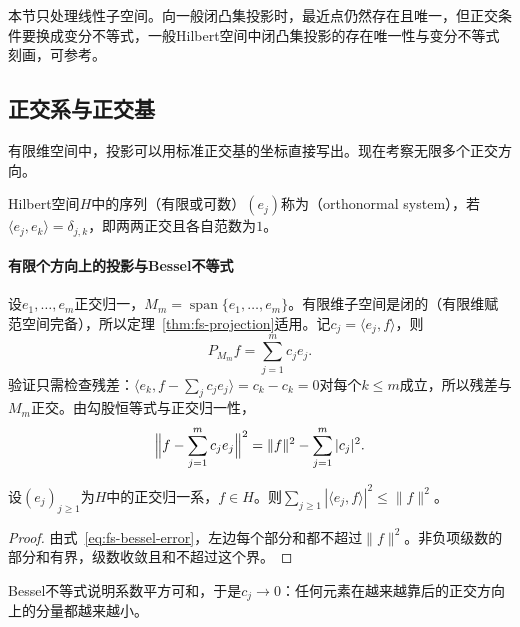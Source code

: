 本节只处理线性子空间。向一般闭凸集投影时，最近点仍然存在且唯一，但正交条件要换成变分不等式，一般Hilbert空间中闭凸集投影的存在唯一性与变分不等式刻画，可参考。

\subsection{正交系与正交基}
\label{sec:fs-orthonormal-bases}

有限维空间中，投影可以用标准正交基的坐标直接写出。现在考察无限多个正交方向。

\begin{definition}[正交归一系]
\label{def:fs-orthonormal}
Hilbert空间$H$中的序列（有限或可数）$(e_j)$称为（orthonormal system），若$\langle e_j,e_k\rangle=\delta_{j,k}$，即两两正交且各自范数为$1$。
\end{definition}

\paragraph{有限个方向上的投影与Bessel不等式}
设$e_1,\ldots,e_m$正交归一，$M_m=\operatorname{span}\{e_1,\ldots,e_m\}$。有限维子空间是闭的（有限维赋范空间完备），所以定理~\ref{thm:fs-projection}适用。记$c_j=\langle e_j,f\rangle$，则
\begin{equation}
 P_{M_m}f=\sum_{j=1}^mc_je_j .
 \label{eq:fs-finite-projection}
\end{equation}
验证只需检查残差：$\langle e_k,f-\sum_jc_je_j\rangle=c_k-c_k=0$对每个$k\leq m$成立，所以残差与$M_m$正交。由勾股恒等式与正交归一性，
\begin{equation}
 \Bigl\|f-\sum_{j=1}^mc_je_j\Bigr\|^2=\|f\|^2-\sum_{j=1}^m|c_j|^2 .
 \label{eq:fs-bessel-error}
\end{equation}

\begin{theorem}[Bessel不等式]
\label{thm:fs-bessel}
设$(e_j)_{j\geq1}$为$H$中的正交归一系，$f\in H$。则$\sum_{j\geq1}|\langle e_j,f\rangle|^2\leq\|f\|^2$。
\end{theorem}

\begin{proof}
由式~\eqref{eq:fs-bessel-error}，左边每个部分和都不超过$\|f\|^2$。非负项级数的部分和有界，级数收敛且和不超过这个界。
\end{proof}

Bessel不等式说明系数平方可和，于是$c_j\to0$：任何元素在越来越靠后的正交方向上的分量都越来越小。

